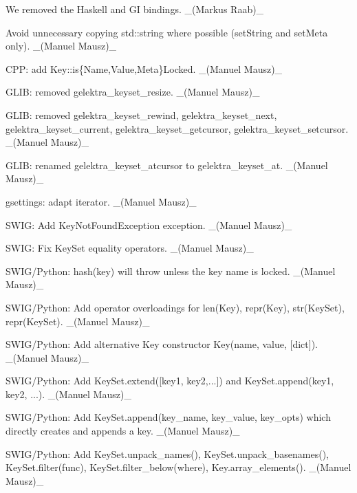 \begin{DoxyItemize}
\item We removed the Haskell and GI bindings. \+\_\+(\+Markus Raab)\+\_\+
\item Avoid unnecessary copying std\+::string where possible (set\+String and set\+Meta only). \+\_\+(\+Manuel Mausz)\+\_\+
\item C\+PP\+: add {\ttfamily Key\+::is\{Name,Value,Meta\}Locked}. \+\_\+(\+Manuel Mausz)\+\_\+
\item G\+L\+IB\+: removed {\ttfamily gelektra\+\_\+keyset\+\_\+resize}. \+\_\+(\+Manuel Mausz)\+\_\+
\item G\+L\+IB\+: removed {\ttfamily gelektra\+\_\+keyset\+\_\+rewind}, {\ttfamily gelektra\+\_\+keyset\+\_\+next}, {\ttfamily gelektra\+\_\+keyset\+\_\+current}, {\ttfamily gelektra\+\_\+keyset\+\_\+getcursor}, {\ttfamily gelektra\+\_\+keyset\+\_\+setcursor}. \+\_\+(\+Manuel Mausz)\+\_\+
\item G\+L\+IB\+: renamed {\ttfamily gelektra\+\_\+keyset\+\_\+atcursor} to {\ttfamily gelektra\+\_\+keyset\+\_\+at}. \+\_\+(\+Manuel Mausz)\+\_\+
\item gsettings\+: adapt iterator. \+\_\+(\+Manuel Mausz)\+\_\+
\item S\+W\+IG\+: Add {\ttfamily Key\+Not\+Found\+Exception} exception. \+\_\+(\+Manuel Mausz)\+\_\+
\item S\+W\+IG\+: Fix Key\+Set equality operators. \+\_\+(\+Manuel Mausz)\+\_\+
\item S\+W\+I\+G/\+Python\+: {\ttfamily hash(key)} will throw unless the key name is locked. \+\_\+(\+Manuel Mausz)\+\_\+
\item S\+W\+I\+G/\+Python\+: Add operator overloadings for {\ttfamily len(\+Key)}, {\ttfamily repr(\+Key)}, {\ttfamily str(\+Key\+Set)}, {\ttfamily repr(\+Key\+Set)}. \+\_\+(\+Manuel Mausz)\+\_\+
\item S\+W\+I\+G/\+Python\+: Add alternative Key constructor {\ttfamily Key(name, value, \mbox{[}dict\mbox{]})}. \+\_\+(\+Manuel Mausz)\+\_\+
\item S\+W\+I\+G/\+Python\+: Add {\ttfamily Key\+Set.\+extend(\mbox{[}key1, key2,...\mbox{]})} and {\ttfamily Key\+Set.\+append(key1, key2, ...)}. \+\_\+(\+Manuel Mausz)\+\_\+
\item S\+W\+I\+G/\+Python\+: Add {\ttfamily Key\+Set.\+append(key\+\_\+name, key\+\_\+value, key\+\_\+opts)} which directly creates and appends a key. \+\_\+(\+Manuel Mausz)\+\_\+
\item S\+W\+I\+G/\+Python\+: Add {\ttfamily Key\+Set.\+unpack\+\_\+names()}, {\ttfamily Key\+Set.\+unpack\+\_\+basenames()}, {\ttfamily Key\+Set.\+filter(func)}, {\ttfamily Key\+Set.\+filter\+\_\+below(where)}, {\ttfamily Key.\+array\+\_\+elements()}. \+\_\+(\+Manuel Mausz)\+\_\+
\end{DoxyItemize}


